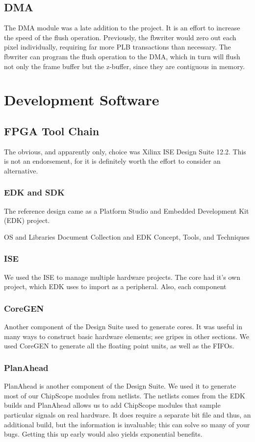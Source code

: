\documentclass[letterpaper,10pt]{article}
\begin{document}
\subsection{DMA}
The DMA module was a late addition to the project.  It is an effort to increase the speed of the flush operation.  Previously, the fbwriter would zero out each pixel individually, requiring far more PLB transactions than necessary.  The fbwriter can program the flush operation to the DMA, which in turn will flush not only the frame buffer but the z-buffer, since they are contiguous in memory.

\section{Development Software}

\subsection{FPGA Tool Chain}
The obvious, and apparently only, choice was Xilinx ISE Design Suite 12.2.  This is not an endorsement, for it is definitely worth the effort to consider an alternative.

\subsubsection{EDK and SDK}
The reference design came as a Platform Studio and Embedded Development Kit (EDK) project.  

OS and Libraries Document Collection and EDK Concept, Tools, and Techniques

\subsubsection{ISE}
We used the ISE to manage multiple hardware projects.  The core had it's own project, which EDK uses to import as a peripheral.  Also, each component 

\subsubsection{CoreGEN}
Another component of the Design Suite used to generate cores.  It was useful in many ways to construct basic hardware elements; see gripes in other sections. We used CoreGEN to generate all the floating point units, as well as the FIFOs.

\subsubsection{PlanAhead}
PlanAhead is another component of the Design Suite.  We used it to generate most of our ChipScope modules from netlists.  The netlists comes from the EDK builds and PlanAhead allows us to add ChipScope modules that sample particular signals on real hardware.  It does require a separate bit file and thus, an additional build, but the information is invaluable; this can solve so many of your bugs.  Getting this up early would also yields exponential benefits.
\end{document}
